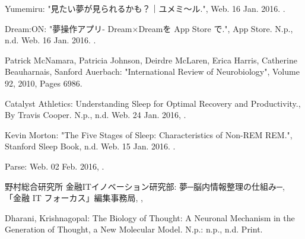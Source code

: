 \begin{bib}[100]
\begin{flushleft}
  Yumemiru:
  \newblock  "見たい夢が見られるかも？｜ユメミ〜ル.",
  \newblock Web. 16 Jan. 2016.
  .
\end{flushleft}

\begin{flushleft}
  Dream:ON:
  \newblock "夢操作アプリ- Dream×Dreamを App Store で.",
  \newblock App Store. N.p., n.d. Web. 16 Jan. 2016.
  .
\end{flushleft}

\begin{flushleft}
  Patrick McNamara, Patricia Johnson, Deirdre McLaren, Erica Harris, Catherine Beauharnais, Sanford Auerbach:
  \newblock "International Review of Neurobiology",
  \newblock Volume 92, 2010, Pages 6986.
\end{flushleft}

\begin{flushleft}
  Catalyst Athletics:
  \newblock Understanding Sleep for Optimal Recovery and Productivity.,
  \newblock By Travis Cooper. N.p., n.d. Web. 24 Jan. 2016,
  .
\end{flushleft}

\begin{flushleft}
  Kevin Morton:
  \newblock "The Five Stages of Sleep: Characteristics of Non-REM REM.",
  \newblock Stanford Sleep Book, n.d. Web. 15 Jan. 2016.
  .
\end{flushleft}

\begin{flushleft}
  Parse:
  \newblock Web. 02 Feb. 2016,
  .
\end{flushleft}

\begin{flushleft}
  野村総合研究所 金融ITイノベーション研究部:
  \newblock 夢─脳内情報整理の仕組み─,
  \newblock 「金融 IT フォーカス」編集事務局,
  ,
\end{flushleft}

\begin{flushleft}
  Dharani, Krishnagopal:
  \newblock The Biology of Thought: A Neuronal Mechanism in the Generation of Thought,
  \newblock a New Molecular Model. N.p.: n.p., n.d. Print.
\end{flushleft}


\end{bib}

